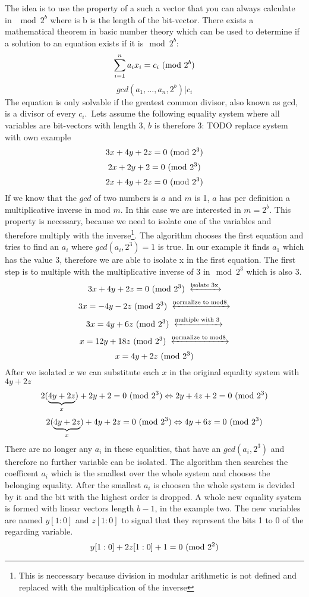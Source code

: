 The idea is to use the property of a such a vector that you can always calculate in $\mod{2^b}$ where is b is the length of the bit-vector.
There exists a mathematical theorem in basic number theory which can be used to determine if a solution to an equation exists if it is$\mod{2^b}$:
$$\sum_{i=1}^{n} a_ix_i = c_i  \ (\mathrm{mod}\ 2^b)$$
$$gcd(a_1,...,a_n,2^b) | c_i$$
The equation is only solvable if the greatest common divisor, also known as gcd, is a divisor of every $c_i$.\
Lets assume the following equality system where all variables are bit-vectors with length 3, $b$ is therefore 3:
TODO replace system with own example
$$3x+4y+2z=0 \ (\mathrm{mod}\ 2^3)$$
$$2x+2y+2=0  \ (\mathrm{mod}\ 2^3)$$
$$2x+4y+2z=0 \ (\mathrm{mod}\ 2^3)$$
If we know that the $gcd$ of two numbers is $a$ and $m$ is 1, $a$ has per definition a multiplicative inverse in mod $m$. In this case we are interested in $m=2^b$. This property is necessary, because we need to isolate one of the variables and therefore multiply with the inverse\footnote{This is neccessary because division in modular arithmetic is not defined and replaced with the multiplication of the inverse}.
The algorithm chooses the first equation and tries to find an $a_i$ where $gcd(a_i,2^3) = 1$ is true. In our example it finds $a_1$ which has the value $3$, therefore we are able to isolate x in the first equation.
The first step is to multiple with the multiplicative inverse of 3 in$\mod{2^3}$ which is also 3.
$$3x+4y+2z = 0 \Mod{2^3} \xleftrightarrow{\text{isolate 3x}}$$
$$3x=-4y-2z  \Mod{2^3}   \xleftrightarrow{\text{normalize to mod8}}$$
$$3x=4y+6z  \Mod{2^3}  \xleftrightarrow{\text{multiple with 3}}$$
$$x=12y+18z \Mod{2^3}  \xleftrightarrow{\text{normalize to mod8}}$$
$$x=4y+2z \ (\mathrm{mod}\ 2^3) $$
After we isolated $x$ we can substitute each $x$ in the original equality system with $4y+2z$
$$2(\underbrace{4y+2z}_{x})+2y+2=0 \ (\mathrm{mod}\ 2^3) \Leftrightarrow 2y + 4z + 2 = 0\ (\mathrm{mod}\ 2^3) $$
$$2(\underbrace{4y+2z}_{x})+ 4y + 2z = 0 \ (\mathrm{mod}\ 2^3) \Leftrightarrow 4y + 6z = 0\ (\mathrm{mod}\ 2^3) $$
There are no longer any ${a_i}$ in these equalities, that have an $gcd(a_i,2^3)$ and therefore no further variable can be isolated.
The algorithm then searches the coefficent $a_i$ which is the smallest over the whole system and chooses the belonging equality.
After the smallest $a_i$ is choosen the whole system is devided by it and the bit with the highest order is dropped.
A whole new equality system is formed with linear vectors length $b-1$, in the example two.
The new variables are named $y[1:0]$ and $z[1:0]$ to signal that they represent the bits 1 to 0 of the regarding variable.
$$y[1 : 0] + 2z[1 : 0] + 1 = 0 \ (\mathrm{mod}\ 2^2)$$
